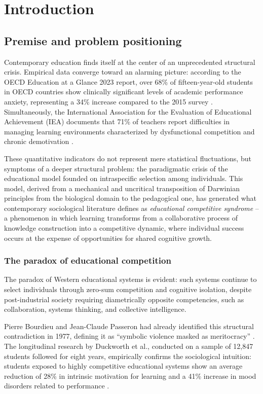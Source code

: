 \chapter{Introduction}
\label{introduzione}

\section{Premise and problem positioning}

Contemporary education finds itself at the center of an unprecedented structural crisis. Empirical data converge toward an alarming picture: according to the OECD Education at a Glance 2023 report, over 68\% of fifteen-year-old students in OECD countries show clinically significant levels of academic performance anxiety, representing a 34\% increase compared to the 2015 survey \cite{OECD2023}. Simultaneously, the International Association for the Evaluation of Educational Achievement (IEA) documents that 71\% of teachers report difficulties in managing learning environments characterized by dysfunctional competition and chronic demotivation \cite{IEA2023}.

These quantitative indicators do not represent mere statistical fluctuations, but symptoms of a deeper structural problem: the paradigmatic crisis of the educational model founded on intraspecific selection among individuals. This model, derived from a mechanical and uncritical transposition of Darwinian principles from the biological domain to the pedagogical one, has generated what contemporary sociological literature defines as \textit{educational competitive syndrome} -- a phenomenon in which learning transforms from a collaborative process of knowledge construction into a competitive dynamic, where individual success occurs at the expense of opportunities for shared cognitive growth.

\newpage 
\subsection{The paradox of educational competition}

The paradox of Western educational systems is evident: such systems continue to select individuals through zero-sum competition and cognitive isolation, despite post-industrial society requiring diametrically opposite competencies, such as collaboration, systems thinking, and collective intelligence.

Pierre Bourdieu and Jean-Claude Passeron had already identified this structural contradiction in 1977, defining it as ``symbolic violence masked as meritocracy'' \cite{Bourdieu1977}. The longitudinal research by Duckworth et al., conducted on a sample of 12,847 students followed for eight years, empirically confirms the sociological intuition: students exposed to highly competitive educational systems show an average reduction of 28\% in intrinsic motivation for learning and a 41\% increase in mood disorders related to performance \cite{Duckworth2019}.

